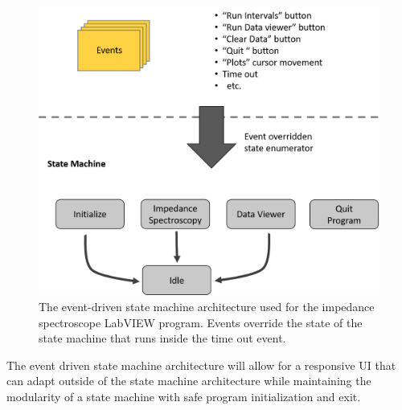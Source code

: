 \begin{figure}[h]
    \centering
    \includegraphics[width=\textwidth]{images/program_overview.png}
    \caption{The event-driven state machine architecture used for the impedance spectroscope LabVIEW program. Events override the state of the state machine that runs inside the time out event.}
    \label{fig:event_driven_state_machine_architecture}
\end{figure}

\par The event driven state machine architecture will allow for a responsive UI that can adapt outside of the state machine architecture while maintaining the modularity of a state machine with safe program initialization and exit. 